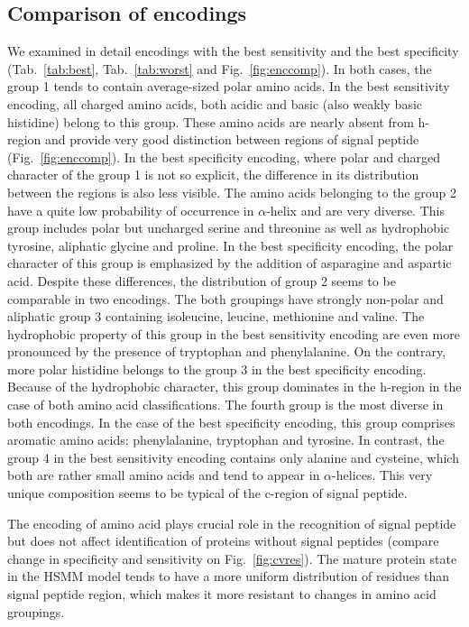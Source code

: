 \documentclass[10pt,letterpaper]{article}
\begin{document}
\subsection*{Comparison of encodings}

We examined in detail encodings with the best sensitivity and the best specificity (Tab.~\ref{tab:best}, Tab.~\ref{tab:worst} and Fig.~\ref{fig:enccomp}). In both cases, the group 1 tends to contain average-sized polar amino acids. In the best sensitivity encoding, all charged amino acids, both acidic and basic (also weakly basic histidine) belong to this group. These amino acids are nearly absent from h-region and provide very good distinction between regions of signal peptide (Fig.~\ref{fig:enccomp}). In the best specificity encoding, where polar and charged character of the group 1 is not so explicit, the difference in its distribution between the regions is also less visible.
The amino acids belonging to the group 2 have a quite low probability of occurrence in $\alpha$-helix and are very diverse. This group includes polar but uncharged serine and threonine as well as hydrophobic tyrosine, aliphatic glycine and proline. In the best specificity encoding, the polar character of this group is emphasized by the addition of asparagine and aspartic acid. Despite these differences, the distribution of group 2 seems to be comparable in two encodings. The both groupings have strongly non-polar and aliphatic group 3 containing isoleucine, leucine, methionine and valine. The hydrophobic property of this group in the best sensitivity encoding are even more pronounced by the presence of tryptophan and phenylalanine. On the contrary, more polar histidine belongs to the group 3 in the best specificity encoding. Because of the hydrophobic character, this group dominates in the h-region in the case of both amino acid classifications.
The fourth group is the most diverse in both encodings. In the case of the best specificity encoding, this group comprises aromatic amino acids: phenylalanine, tryptophan and tyrosine. In contrast, the group 4 in the best sensitivity encoding contains only alanine and cysteine, which both are rather small amino acids and tend to appear in $\alpha$-helices. This very unique composition seems to be typical of the c-region of signal peptide.

The encoding of amino acid plays crucial role in the recognition of signal peptide but does not affect identification of proteins without signal peptides (compare change in specificity and sensitivity on Fig.~\ref{fig:cvres}). The mature protein state in the HSMM model tends to have a more uniform distribution of residues than signal peptide region, which makes it more resistant to changes in amino acid groupings.
\end{document}
